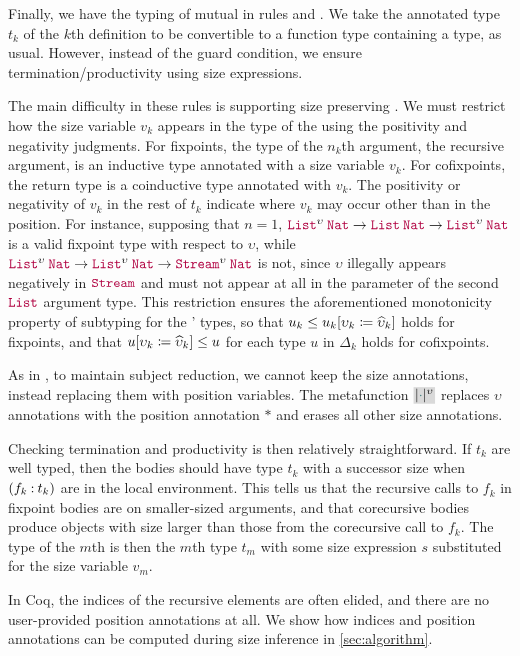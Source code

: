 Finally, we have the typing of mutual \cofixpoints in rules  and .
We take the annotated type $t_k$ of the $k$th \cofixpoint definition to be convertible to a function type containing a \coinductive type, as usual.
However, instead of the guard condition, we ensure termination/productivity using size expressions.

The main difficulty in these rules is supporting size preserving \cofixpoints.
We must restrict how the size variable $v_k$ appears in the type of the \cofixpoints using the positivity and negativity judgments.
For fixpoints, the type of the $n_k$th argument, the recursive argument, is an inductive type annotated with a size variable $v_k$.
For cofixpoints, the return type is a coinductive type annotated with $v_k$.
The positivity or negativity of $v_k$ in the rest of $t_k$ indicate where $v_k$ may occur other than in the \corecursive position.
For instance, supposing that $n = 1$,
$\app{\List^\upsilon}{\Nat} \to \app{\List}{\Nat} \to \app{\List^\upsilon}{\Nat}$
is a valid fixpoint type with respect to $\upsilon$, while
$\app{\List^\upsilon}{\Nat} \to \app{\List^\upsilon}{\Nat} \to \app{\Stream^\upsilon}{\Nat}$
is not, since $\upsilon$ illegally appears negatively in $\Stream$ and must not appear at all in the parameter of the second $\List$ argument type.
This restriction ensures the aforementioned monotonicity property of subtyping for the \cofixpoints' types,
so that $u_k \leq u_k [\upsilon_k \coloneqq \widehat{\upsilon}_k]$ holds for fixpoints,
and that $u [\upsilon_k \coloneqq \widehat{\upsilon}_k] \leq u$ for each type $u$ in $\Delta_k$ holds for cofixpoints.

As in , to maintain subject reduction, we cannot keep the size annotations, instead replacing them with position variables.
The metafunction $\new{\erase{\ph}^\upsilon}$ replaces $\upsilon$ annotations with the position annotation $\ast$ and erases all other size annotations.

Checking termination and productivity is then relatively straightforward.
If $t_k$ are well typed, then the \cofixpoint bodies should have type $t_k$ with a successor size when $(f_k \mathbin{:} t_k)$ are in the local environment.
This tells us that the recursive calls to $f_k$ in fixpoint bodies are on smaller-sized arguments, and that corecursive bodies produce objects with size larger than those from the corecursive call to $f_k$.
The type of the $m$th \cofixpoint is then the $m$th type $t_m$ with some size expression $s$ substituted for the size variable $v_m$.

In Coq, the indices of the recursive elements are often elided, and there are no user-provided position annotations at all.
We show how indices and position annotations can be computed during size inference in \autoref{sec:algorithm}.

